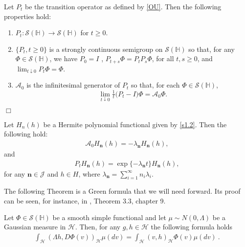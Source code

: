 \documentclass[review, onefignum, onetabnum]{siamart171218}
\begin{document}
\begin{lemma}
    Let $P_t$ be the transition operator as defined by \eqref{OU}. Then
    the following properties hold:
    \begin{enumerate}
     \item
        $P_t : \mathcal{S}(\mathbb{H})\rightarrow  \mathcal{S}(\mathbb{H})$
        for $t \ge 0$.
    \item
        $\{P_t , t \ge 0\}$
        is a strongly continuous semigroup on
        $\mathcal{S}(\mathbb{H})$ so that, for any
        $\Phi \in \mathcal{S}(\mathbb{H})$, we have $P_0 = I$ ,
        $P_{t+s} \Phi = P_t P_s \Phi$, for all $t, s \ge 0$, and
        $\lim_{t\downarrow 0}
        P_t \Phi = \Phi$.
    \item
        $\mathcal{A}_0$ is the infinitesimal generator of $P_t$ so that, for
        each $\Phi\in\mathcal{S}(\mathbb{H})$,
        \[
            \lim_{t\downarrow 0} \tfrac{1}{t}\big(P_t- I\big)\Phi
                = \mathcal{A}_0\Phi.
        \]
    \end{enumerate}
    \hfill $\Box$
\end{lemma}

\begin{lemma}\label{Pt-Her}
        Let $H_n(h)$ be a Hermite polynomial functional given by \eqref{s1.2}.
        Then the following hold:
    \begin{align}
        \mathcal{A}_0 H_{\mathbf{n}}(h) =
        -\lambda_{\mathbf{n}} H_{\mathbf{n}}(h),
    \end{align}
    and
    \begin{align}
        P_t H_{\mathbf{n}} (h)
        = \exp\{-\lambda_{\mathbf{n}} t\} H_{\mathbf{n}} (h),
    \end{align}
    for any $\mathbf{n}\in\mathcal{J}$ and $h \in H$, where
    $
        \displaystyle
        \lambda_{\mathbf{n}}=\sum_{i=1}^\infty n_i\lambda_i.
    $

\end{lemma}

The following Theorem is a Green formula that we will need forward.
Its proof can be seen, for instance, in \cite{liu}, Theorem 3.3, chapter 9.

\begin{theorem}\label{green-form}
    Let
    $
        \Phi \in \mathcal{S}(\mathbb{H})
    $ be a smooth simple functional and let
    $\mu\sim N(0,\Lambda)$ be a Gaussian measure in $\mathcal{H}$. Then,
    for any $g,h\in\mathcal{H}$ the following formula holds
    \begin{align}
        \int_{\mathcal{H}} (\Lambda h,D\Phi(v))_{\mathcal{H}}  \mu(dv) =
            \int_{\mathcal{H}} (v,h)_{\mathcal{H}}
            \Phi(v) \mu(dv) \ .
            \label{s2.2.1}
    \end{align}

\end{theorem}
\end{document}
